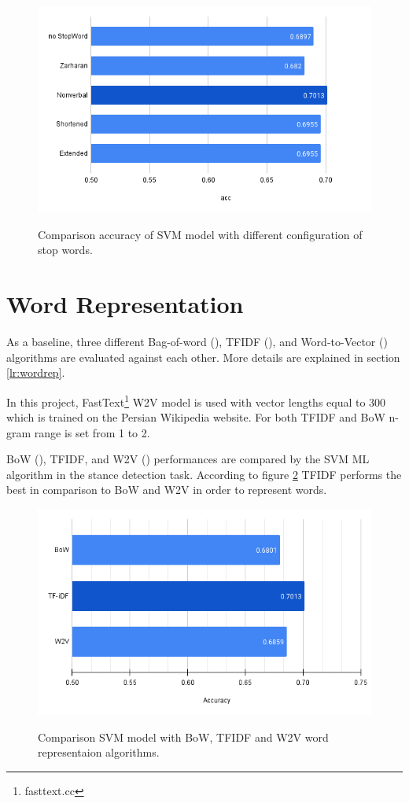 \begin{figure}%
	\centering
	{\includegraphics[width=12.5cm]{statistics/AccuracyScore.png} }
	\caption{Comparison accuracy of \ac{SVM} model with different configuration of stop words.}%
	\label{fig:stopwords}%
\end{figure}

\section{Word Representation}
As a baseline, three different Bag-of-word (\cite{bow}), \ac{TFIDF} (\cite{tfidf}), and Word-to-Vector (\cite{word2vec}) algorithms are evaluated against each other. More details are explained in section \ref{lr:wordrep}.

In this project, FastText\footnote{fasttext.cc} \ac{W2V} model is used with vector lengths equal to 300 which is trained on the Persian Wikipedia website. For both \ac{TFIDF} and \ac{BoW} n-gram range is set from 1 to 2. 

\ac{BoW} (\cite{bow}), \ac{TFIDF}, and \ac{W2V} (\cite{word2vec}) performances are compared by the \ac{SVM} \ac{ML} algorithm in the stance detection task. According to figure \ref{fig:wordrep} \ac{TFIDF} performs the best in comparison to \ac{BoW} and \ac{W2V} in order to represent words.
\begin{figure}%
	\centering
	{\includegraphics[width=12.5cm]{statistics/WordRep.png} }
	\caption{Comparison \ac{SVM} model with \ac{BoW}, \ac{TFIDF} and \ac{W2V} word representaion algorithms.}%
	\label{fig:wordrep}%
\end{figure}

